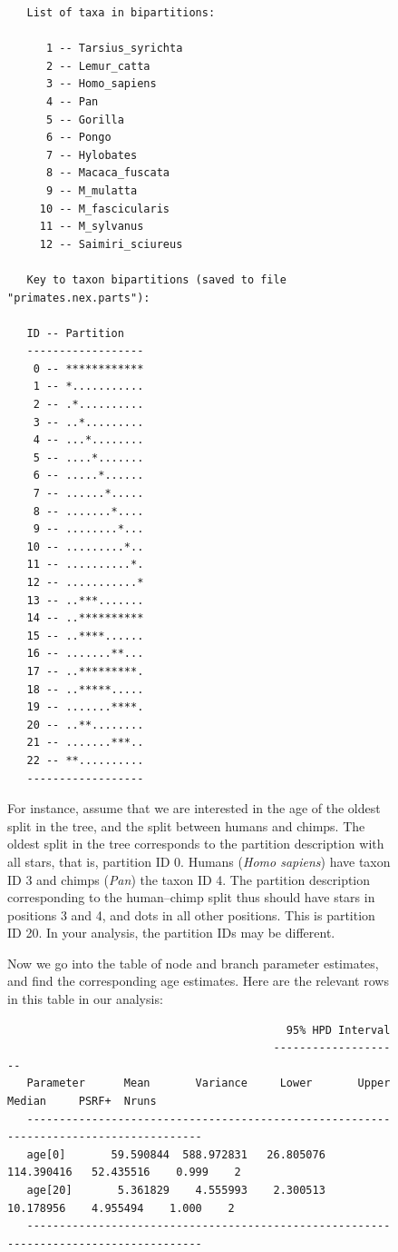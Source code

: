 \documentclass[12pt]{book}
\begin{document}
\begin{figure}[h]
\footnotesize
\begin{singlespacing}
\begin{verbatim}
   List of taxa in bipartitions:

      1 -- Tarsius_syrichta
      2 -- Lemur_catta
      3 -- Homo_sapiens
      4 -- Pan
      5 -- Gorilla
      6 -- Pongo
      7 -- Hylobates
      8 -- Macaca_fuscata
      9 -- M_mulatta
     10 -- M_fascicularis
     11 -- M_sylvanus
     12 -- Saimiri_sciureus

   Key to taxon bipartitions (saved to file "primates.nex.parts"):

   ID -- Partition
   ------------------
    0 -- ************
    1 -- *...........
    2 -- .*..........
    3 -- ..*.........
    4 -- ...*........
    5 -- ....*.......
    6 -- .....*......
    7 -- ......*.....
    8 -- .......*....
    9 -- ........*...
   10 -- .........*..
   11 -- ..........*.
   12 -- ...........*
   13 -- ..***.......
   14 -- ..**********
   15 -- ..****......
   16 -- .......**...
   17 -- ..*********.
   18 -- ..*****.....
   19 -- .......****.
   20 -- ..**........
   21 -- .......***..
   22 -- **..........
   ------------------
\end{verbatim}
\end{singlespacing}
\normalsize

For instance, assume that we are interested in the age of the oldest split in the tree, and the
split between humans and chimps. The oldest split in the tree corresponds to the partition
description with all stars, that is, partition ID 0. Humans (\textit{Homo sapiens}) have taxon ID 3
and chimps (\textit{Pan}) the taxon ID 4. The partition description corresponding to the
human--chimp split thus should have stars in positions 3 and 4, and dots in all other positions.
This is partition ID 20. In your analysis, the partition IDs may be different.

Now we go into the table of node and branch parameter estimates, and find the corresponding age
estimates. Here are the relevant rows in this table in our analysis:

\footnotesize
\begin{singlespacing}
\begin{verbatim}
                                           95% HPD Interval
                                         --------------------
   Parameter      Mean       Variance     Lower       Upper       Median     PSRF+  Nruns
   --------------------------------------------------------------------------------------
   age[0]       59.590844  588.972831   26.805076  114.390416   52.435516    0.999    2
   age[20]       5.361829    4.555993    2.300513   10.178956    4.955494    1.000    2
   --------------------------------------------------------------------------------------
\end{verbatim}
\end{singlespacing}
\normalsize


\end{figure}
\end{document}
